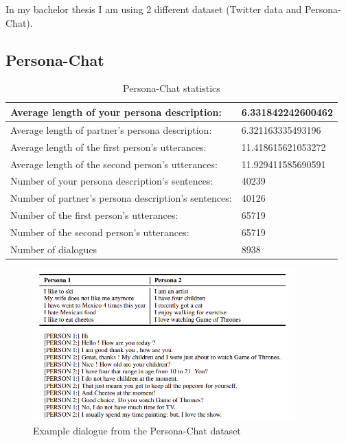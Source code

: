 In my bachelor thesis I am using 2 different dataset (Twitter data and Persona-Chat). 

\subsection{Persona-Chat}
\begin{table}[t]
\centering
  \begin{tabular}{|p{8cm}|p{4cm}|} 
  \hline
  Average length of  your persona description: & 6.331842242600462 \\
  \hline
  Average length of partner's persona description: & 6.321163335493196 \\
  \hline
  Average length of the first person's utterances: & 11.418615621053272 \\
  \hline
  Average length of the second person's utterances: & 11.929411585690591 \\
  \hline
  Number of your persona description's sentences: & 40239 \\
  \hline
  Number of partner's  persona description's sentences: & 40126 \\
  \hline
  Number of the first person's utterances: & 65719 \\
  \hline
  Number of the second person's utterances:  & 65719 \\
  \hline
  Number of dialogues & 8938 \\
  \hline
  \end{tabular}
  \caption{Persona-Chat statistics}
\label{tab:persona_chat}
\end{table}

\begin{figure}[hbt]
  \centering
  \includegraphics[width=0.9\textwidth]{figures/persona_chat.png}
  \caption{Example dialogue from the Persona-Chat dataset \cite{persona_chat}}
  \label{persona_chat}
\end{figure}

